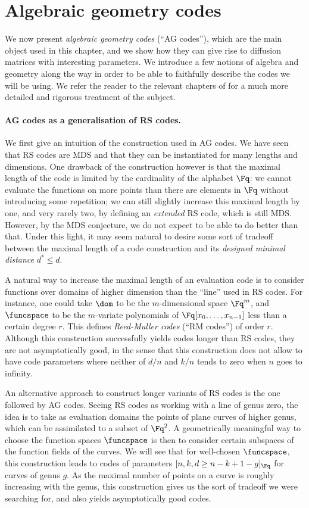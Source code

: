 \section{Algebraic geometry codes}
\label{sec:ag}

We now present \emph{algebraic geometry codes} (``AG codes''), which are the main object used in this chapter,
and we show how they can give rise to diffusion matrices with interesting parameters.
We introduce a few notions of algebra and geometry along the way in order to be able to faithfully describe the codes we will
be using.
We refer the reader to the relevant chapters of \cite{vanlint,tvn,stichtenoth,fulton} for a much more detailed and rigorous treatment of the subject.

\paragraph{AG codes as a generalisation of RS codes.}
We first give an intuition of the construction used in AG codes. We have seen that RS codes are MDS
and that they can be instantiated for many lengths and dimensions. One drawback of the construction however
is that the maximal length of the code is limited by the cardinality of the alphabet $\Fq$: we
cannot evaluate the functions on more points than there are elements in $\Fq$ without introducing some
repetition; we can still slightly increase this maximal length by one, and very rarely two, by defining an \emph{extended} RS code, which is still MDS.
However, by the MDS
conjecture, we do not expect to be able to do better than that.
Under this light, it may seem natural to desire some sort of
tradeoff between the maximal length of a code construction and its \emph{designed minimal distance} $d^* \leq d$.

A natural way to increase the maximal length of an evaluation code is to consider functions over domains
of higher dimension than the ``line'' used in RS codes. For instance, one could take $\dom$ to be the
$m$-dimensional space $\Fq^m$, and $\funcspace$ to be the $m$-variate polynomials of $\Fq[x_0,\ldots,x_{n-1}]$
less than a certain degree $r$. This defines \emph{Reed-Muller codes} (``RM codes'') of order $r$.
Although this construction successfully yields codes longer than RS codes, they are not asymptotically good, in
the sense that this construction does not allow to have code parameters where neither of $d/n$ and $k/n$ tends to
zero when $n$ goes to infinity.

An alternative approach to construct longer variants of RS codes is the one followed by AG codes. Seeing
RS codes as working with a line of genus zero, the idea is to take as evaluation domains
the points of plane curves of higher genus,
which can be assimilated to a subset of $\Fq^2$. A geometrically
meaningful way to choose the function spaces $\funcspace$ is then to consider certain subspaces of
the function fields of the curves. We will see that for well-chosen $\funcspace$, this construction
leads to codes of parameters $[n, k, d \geq n - k + 1 - g]_{\Fq}$ for curves of genus $g$. As the
maximal number of points on a curve is roughly increasing with the genus, this construction gives us the
sort of tradeoff we were searching for, and also yields asymptotically good codes.

